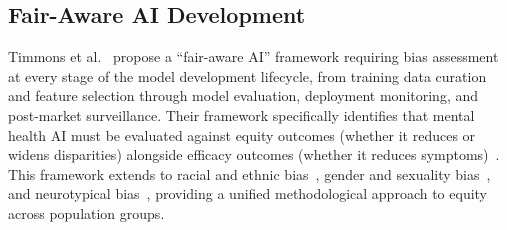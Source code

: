 \subsection{Fair-Aware AI Development}

Timmons et al.~\cite{timmons_2023} propose a ``fair-aware AI'' framework requiring bias assessment at every stage of the model development lifecycle, from training data curation and feature selection through model evaluation, deployment monitoring, and post-market surveillance. Their framework specifically identifies that mental health AI must be evaluated against equity outcomes (whether it reduces or widens disparities) alongside efficacy outcomes (whether it reduces symptoms)~\cite{timmons_2023}. This framework extends to racial and ethnic bias~\cite{haider_2024,omar_2025}, gender and sexuality bias~\cite{straw_2020}, and neurotypical bias~\cite{killian_2023}, providing a unified methodological approach to equity across population groups.
